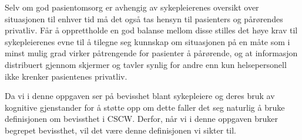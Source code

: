 \noindent
Selv om god pasientomsorg er avhengig av sykepleierenes oversikt over situasjonen til enhver tid må det også tas hensyn til pasienters og pårørendes privatliv. Får å opprettholde en god balanse mellom disse stilles det høye krav til sykepleierenes evne til å tilegne seg kunnskap om situasjonen på en måte som i minst mulig grad virker påtrengende for pasienter å pårørende, og at informasjon distribuert gjennom skjermer og tavler synlig for andre enn kun helsepersonell ikke krenker pasientenes privatliv\cite{Ebright10}.

\noindent
Da vi i denne oppgaven ser på bevisshet blant sykepleiere og deres bruk av kognitive gjenstander for å støtte opp om dette faller det seg naturlig å bruke definisjonen om bevissthet i CSCW. Derfor, når vi i denne oppgaven bruker begrepet bevissthet, vil det være denne definisjonen vi sikter til.
